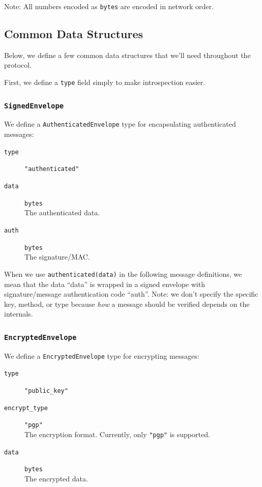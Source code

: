 \documentclass[pdftex,12pt,a4papaer,twoside,notitlepage]{report}
\begin{document}
\begin{appendices}
Note: All numbers encoded as \texttt{bytes} are encoded in network order.

\subsection{Common Data Structures}

Below, we define a few common data structures that we'll need throughout the
protocol.

First, we define a \texttt{type} field simply to make introspection easier.

\subsubsection{\texttt{SignedEnvelope}}

We define a \texttt{AuthenticatedEnvelope} type for encapsulating authenticated messages:

\begin{leftbar}
\begin{description}
\item[\texttt{type}] \verb="authenticated"=
\item[\texttt{data}] \texttt{bytes} \\
  The authenticated data.
\item[\texttt{auth}] \texttt{bytes} \\
  The signature/MAC.
\end{description}
\end{leftbar}

When we use \verb=authenticated(data)= in the following message definitions, we
mean that the data ``data'' is wrapped in a signed envelope with
signature/message authentication code ``auth''. Note: we don't specify the
specific key, method, or type because \emph{how} a message should be verified
depends on the internals.

\subsubsection{\texttt{EncryptedEnvelope}}

We define a \texttt{EncryptedEnvelope} type for encrypting messages:
\begin{leftbar}
\begin{description}
\item[\texttt{type}] \verb="public_key"=
\item[\texttt{encrypt\_type}] \verb="pgp"= \\
  The encryption format. Currently, only \verb="pgp"= is supported.
\item[\texttt{data}] \texttt{bytes} \\
  The encrypted data.
\end{description}
\end{leftbar}


\end{appendices}
\end{document}
